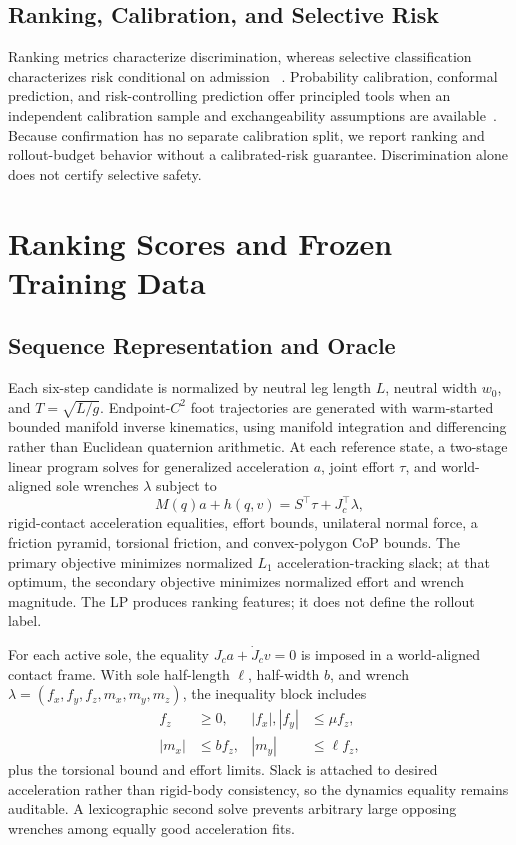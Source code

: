 \documentclass[letterpaper,10pt,conference]{IEEEtran}
\begin{document}
\subsection{Ranking, Calibration, and Selective Risk}
Ranking metrics characterize discrimination, whereas selective classification
characterizes risk conditional on admission
~\cite{elyaniv2010selective,geifman2019selectivenet}. Probability calibration,
conformal prediction, and risk-controlling prediction offer principled tools
when an independent calibration sample and exchangeability assumptions are
available~\cite{niculescu2005probabilities,guo2017calibration,angelopoulos2023conformal,bates2021rcps}.
Because confirmation has no separate calibration split, we report ranking and
rollout-budget behavior without a calibrated-risk guarantee. Discrimination
alone does not certify selective safety.

\section{Ranking Scores and Frozen Training Data}
\subsection{Sequence Representation and Oracle}
Each six-step candidate is normalized by neutral leg length $L$, neutral width
$w_0$, and $T=\sqrt{L/g}$. Endpoint-$C^2$ foot trajectories are generated with
warm-started bounded manifold inverse kinematics, using manifold integration and
differencing rather than Euclidean quaternion arithmetic. At each reference
state, a two-stage linear program solves for generalized acceleration $a$,
joint effort $\tau$, and world-aligned sole wrenches $\lambda$ subject to
\begin{equation}
 M(q)a+h(q,v)=S^\top\tau+J_c^\top\lambda ,
\end{equation}
rigid-contact acceleration equalities, effort bounds, unilateral normal force,
a friction pyramid, torsional friction, and convex-polygon CoP bounds. The
primary objective minimizes normalized $L_1$ acceleration-tracking slack; at
that optimum, the secondary objective minimizes normalized effort and wrench
magnitude. The LP produces ranking features; it does not define the rollout
label.

For each active sole, the equality
$J_c a+\dot{J}_c v=0$ is imposed in a world-aligned contact frame. With sole
half-length $\ell$, half-width $b$, and wrench
$\lambda=(f_x,f_y,f_z,m_x,m_y,m_z)$, the inequality block includes
\begin{equation}
\begin{aligned}
 f_z&\geq0,& |f_x|,|f_y|&\leq\mu f_z,\\
 |m_x|&\leq b f_z,& |m_y|&\leq\ell f_z ,
\end{aligned}
\end{equation}
plus the torsional bound and effort limits. Slack is attached to desired
acceleration rather than rigid-body consistency, so the dynamics equality
remains auditable. A lexicographic second solve prevents arbitrary large
opposing wrenches among equally good acceleration fits.
\end{document}
